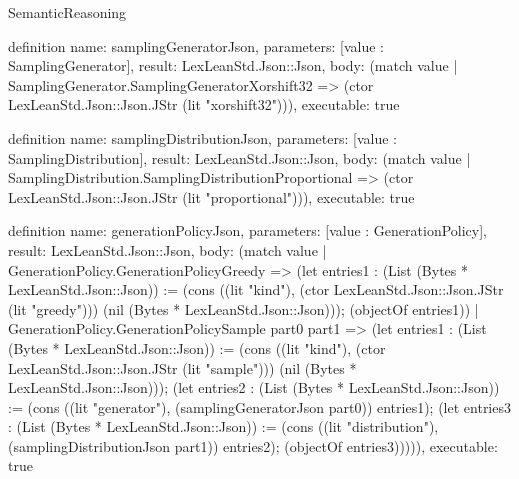 \begin{lexlean}{SemanticReasoning}
\begin{semanticmodule}
definition{
  name: samplingGeneratorJson,
  parameters: [value : SamplingGenerator],
  result: LexLeanStd.Json::Json,
  body: (match value
    | SamplingGenerator.SamplingGeneratorXorshift32 => (ctor LexLeanStd.Json::Json.JStr (lit "xorshift32"))),
  executable: true
}

definition{
  name: samplingDistributionJson,
  parameters: [value : SamplingDistribution],
  result: LexLeanStd.Json::Json,
  body: (match value
    | SamplingDistribution.SamplingDistributionProportional => (ctor LexLeanStd.Json::Json.JStr (lit "proportional"))),
  executable: true
}

definition{
  name: generationPolicyJson,
  parameters: [value : GenerationPolicy],
  result: LexLeanStd.Json::Json,
  body: (match value
    | GenerationPolicy.GenerationPolicyGreedy => (let entries1 : (List (Bytes * LexLeanStd.Json::Json)) := (cons ((lit "kind"), (ctor LexLeanStd.Json::Json.JStr (lit "greedy"))) (nil (Bytes * LexLeanStd.Json::Json))); (objectOf entries1))
    | GenerationPolicy.GenerationPolicySample part0 part1 => (let entries1 : (List (Bytes * LexLeanStd.Json::Json)) := (cons ((lit "kind"), (ctor LexLeanStd.Json::Json.JStr (lit "sample"))) (nil (Bytes * LexLeanStd.Json::Json))); (let entries2 : (List (Bytes * LexLeanStd.Json::Json)) := (cons ((lit "generator"), (samplingGeneratorJson part0)) entries1); (let entries3 : (List (Bytes * LexLeanStd.Json::Json)) := (cons ((lit "distribution"), (samplingDistributionJson part1)) entries2); (objectOf entries3))))),
  executable: true
}


\end{semanticmodule}
\end{lexlean}
